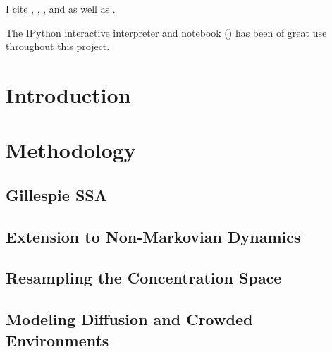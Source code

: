 \documentclass[english,letterpaper,12pt]{article}
\begin{document}
\begin{doublespacing}
I cite \cite{bistable-modeling}, \cite{we-exact}, \cite{we-chemkin}, and \cite{delay-oscillations} as well as \cite{gillespie-ssa}.

The IPython interactive interpreter and notebook (\cite{PER-GRA:2007}) has been of great use throughout this project.

\lipsum[3-4]


\section{Introduction} %
\label{sec:introduction}

\section{Methodology} %
\label{sec:methodology}

\subsection{Gillespie SSA} %
\label{sub:gillespie-ssa}


\subsection{Extension to Non-Markovian Dynamics} %
\label{sub:non-markovian}


\subsection{Resampling the Concentration Space} %
\label{sub:we-resampling-intro}


\subsection{Modeling Diffusion and Crowded Environments} %
\label{sub:diffusion-crowded}



\end{doublespacing}
\end{document}
